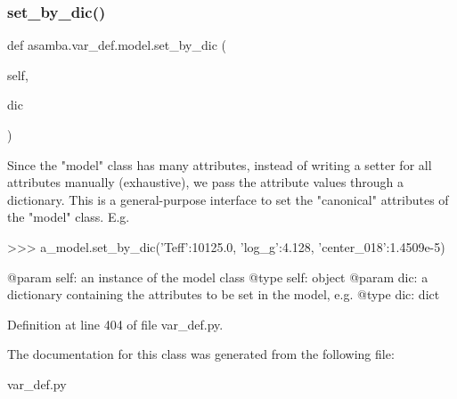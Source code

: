 \subsubsection{\texorpdfstring{set\+\_\+by\+\_\+dic()}{set\_by\_dic()}}
{\footnotesize\ttfamily def asamba.\+var\+\_\+def.\+model.\+set\+\_\+by\+\_\+dic (\begin{DoxyParamCaption}\item[{}]{self,  }\item[{}]{dic }\end{DoxyParamCaption})}

\begin{DoxyVerb}Since the "model" class has many attributes, instead of writing a setter for all 
attributes manually (exhaustive), we pass the attribute values through a dictionary.
This is a general-purpose interface to set the "canonical" attributes of the "model"
class. E.g. 

>>> a_model.set_by_dic({'Teff':10125.0, 'log_g':4.128, 'center_018':1.4509e-5})

@param self: an instance of the model class
@type self: object
@param dic: a dictionary containing the attributes to be set in the model, e.g.
@type dic: dict
\end{DoxyVerb}
 

Definition at line 404 of file var\+\_\+def.\+py.



The documentation for this class was generated from the following file\+:\begin{DoxyCompactItemize}
\item 
var\+\_\+def.\+py\end{DoxyCompactItemize}
